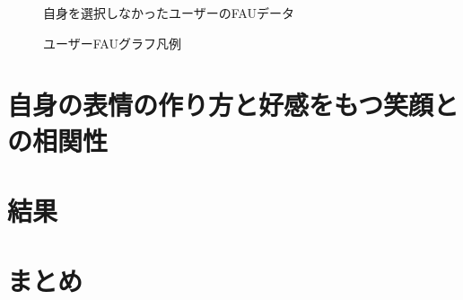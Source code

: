\begin{figure}[htbp]
    \begin{center}
    \end{center}
    \caption{自身を選択しなかったユーザーのFAUデータ}
    \label{fig:choose_else_for_paper}
\end{figure}

\begin{figure}[htbp]
    \begin{center}
    \end{center}
    \caption{ユーザーFAUグラフ凡例}
    \label{fig:usage_guide_fau}
\end{figure}

\section{自身の表情の作り方と好感をもつ笑顔との相関性}
\section{結果}
\section{まとめ}
